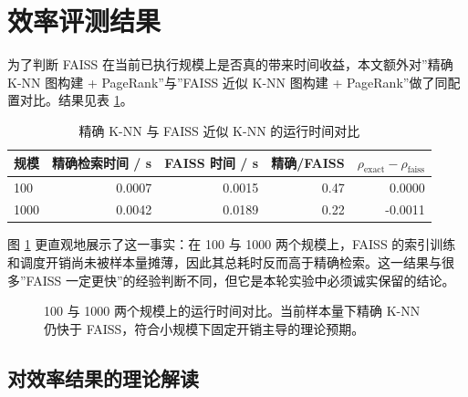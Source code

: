 \section{效率评测结果}
\label{sec:scalability_results}

为了判断 FAISS 在当前已执行规模上是否真的带来时间收益，本文额外对”精确 K-NN 图构建 + PageRank”与”FAISS 近似 K-NN 图构建 + PageRank”做了同配置对比。结果见表 \ref{tab:runtime_real}。

\begin{table}[htbp]
\centering
\caption{精确 K-NN 与 FAISS 近似 K-NN 的运行时间对比}
\label{tab:runtime_real}
\begin{tabular}{lrrrr}
\toprule
规模 & 精确检索时间 / s & FAISS 时间 / s & 精确/FAISS & $\rho_{\text{exact}} - \rho_{\text{faiss}}$ \\
\midrule
100  & 0.0007 & 0.0015 & 0.47 &  0.0000 \\
1000 & 0.0042 & 0.0189 & 0.22 & -0.0011 \\
\bottomrule
\end{tabular}
\end{table}

图 \ref{fig:runtime_real} 更直观地展示了这一事实：在 100 与 1000 两个规模上，FAISS 的索引训练和调度开销尚未被样本量摊薄，因此其总耗时反而高于精确检索。这一结果与很多”FAISS 一定更快”的经验判断不同，但它是本轮实验中必须诚实保留的结论。

\begin{figure}[htbp]
\centering
{}
\caption{100 与 1000 两个规模上的运行时间对比。当前样本量下精确 K-NN 仍快于 FAISS，符合小规模下固定开销主导的理论预期。}
\label{fig:runtime_real}
\end{figure}

\subsection{对效率结果的理论解读}
\label{sec:efficiency_interpretation}

